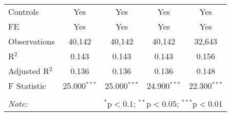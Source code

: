 \begin{table}[!htbp]
\begin{tabular}{@{\extracolsep{5pt}}lcccc}
Controls & Yes & Yes & Yes & Yes \\ 
FE & Yes & Yes & Yes & Yes \\ 
Observations & 40,142 & 40,142 & 40,142 & 32,643 \\ 
R$^{2}$ & 0.143 & 0.143 & 0.143 & 0.156 \\ 
Adjusted R$^{2}$ & 0.136 & 0.136 & 0.136 & 0.148 \\ 
F Statistic & 25.000$^{***}$ & 25.000$^{***}$ & 24.900$^{***}$ & 22.300$^{***}$ \\ 
\hline 
\hline \\[-1.8ex] 
\textit{Note:}  & \multicolumn{4}{r}{$^{*}$p$<$0.1; $^{**}$p$<$0.05; $^{***}$p$<$0.01} \\ 
\end{tabular} 
\end{table} 
